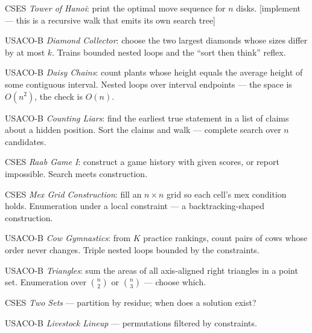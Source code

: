 \begin{exercise}[easy] CSES \emph{Tower of Hanoi}: print the optimal move
sequence for $n$ disks. [implement --- this is a recursive walk that emits
its own search tree]
\end{exercise}
\begin{exercise}[easy] USACO-B \emph{Diamond Collector}: choose the two
largest diamonds whose sizes differ by at most $k$. Trains bounded nested
loops and the ``sort then think'' reflex.
\end{exercise}
\begin{exercise}[easy] USACO-B \emph{Daisy Chains}: count plants whose
height equals the average height of some contiguous interval. Nested loops
over interval endpoints --- the space is $O(n^2)$, the check is $O(n)$.
\end{exercise}
\begin{exercise}[easy] USACO-B \emph{Counting Liars}: find the earliest
true statement in a list of claims about a hidden position. Sort the claims
and walk --- complete search over $n$ candidates.
\end{exercise}
\begin{exercise}[medium] CSES \emph{Raab Game I}: construct a game history
with given scores, or report impossible. Search meets construction.
\end{exercise}
\begin{exercise}[medium] CSES \emph{Mex Grid Construction}: fill an $n
\times n$ grid so each cell's mex condition holds. Enumeration under a local
constraint --- a backtracking-shaped construction.
\end{exercise}
\begin{exercise}[medium] USACO-B \emph{Cow Gymnastics}: from $K$
practice rankings, count pairs of cows whose order never changes. Triple
nested loops bounded by the constraints.
\end{exercise}
\begin{exercise}[medium] USACO-B \emph{Triangles}: sum the areas of all
axis-aligned right triangles in a point set. Enumeration over $\binom{n}{2}$
or $\binom{n}{3}$ --- choose which.
\end{exercise}
\begin{exercise}[easy] CSES \emph{Two Sets} --- partition by residue; when does a solution exist? \end{exercise}
\begin{exercise}[easy] USACO-B \emph{Livestock Lineup} --- permutations filtered by constraints. \end{exercise}
